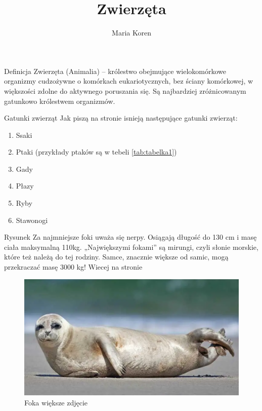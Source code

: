 \documentclass[hyperref={colorlinks = true,linkcolor = black}]{beamer}
\title{Zwierzęta}
\author{Maria Koren}
\begin{document}
\begin{frame}
\titlepage
\end{frame}

\begin{frame}{Definicja}
Zwierzęta (Animalia) – królestwo obejmujące wielokomórkowe organizmy cudzożywne o komórkach eukariotycznych, bez ściany komórkowej, w większości zdolne do aktywnego poruszania się. Są najbardziej zróżnicowanym gatunkowo królestwem organizmów.
\end{frame}

\begin{frame}{Gatunki zwierząt}
Jak piszą na stronie \cite{b1} isnieją następujące gatunki zwierząt:
\begin{enumerate} 
\item Ssaki 
\item Ptaki (przykłady ptaków są w tebeli \ref{tab:tabelka1})
\item Gady 
\item Płazy
\item Ryby  
\item Stawonogi
\end{enumerate}
\end{frame}

\begin{frame}{Rysunek}
Za najmniejsze foki uważa się nerpy. Osiągają długość do 130 cm i masę ciała maksymalną 110kg. „Największymi fokami” są mirungi, czyli słonie morskie, które też należą do tej rodziny. Samce, znacznie większe od samic, mogą przekraczać masę 3000 kg!  Wiecej na stronie \cite{b2}
\begin{figure}[h]
\includegraphics[scale=0.5]{foka.png}
\caption{Foka większe zdjęcie}
\label{fig:obr1}
\end{figure}
\end{frame}
\end{document}

